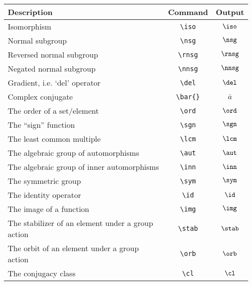 \documentclass[letterpaper,12pt]{article}
\begin{document}
		\begin{center}
		\begin{tabular}{| p{} | c | c |}
		\hline
		\textbf{Description} & \textbf{Command} & \textbf{Output} \\
		\hline \hline
		Isomorphism & \verb|\iso| & $\iso$ \\ \hline
		Normal subgroup & \verb|\nsg| & $\nsg$ \\ \hline
		Reversed normal subgroup & \verb|\rnsg| & $\rnsg$ \\ \hline
		Negated normal subgroup & \verb|\nnsg| & $\nnsg$ \\ \hline
		Gradient, i.e. `del' operator & \verb|\del| & $\del$ \\ \hline
		Complex conjugate & \verb|\bar{}| & $\bar{a}$ \\ \hline
		The order of a set/element & \verb|\ord| & $\ord$ \\ \hline
		The ``sign'' function & \verb|\sgn| & $\sgn$ \\ \hline
		The least common multiple & \verb|\lcm| & $\lcm$ \\ \hline
		The algebraic group of automorphisms & \verb|\aut| & $\aut$ \\ \hline
		The algebraic group of inner automorphisms & \verb|\inn| & $\inn$ \\ 
		\hline
		The symmetric group & \verb|\sym| & $\sym$ \\ \hline
		The identity operator & \verb|\id| & $\id$ \\ \hline
		The image of a function & \verb|\img| & $\img$ \\ \hline
		The stabilizer of an element under a group action & \verb|\stab| & 
				$\stab$ \\ \hline
				The orbit of an element under a group action & \verb|\orb| & 
				$\orb$ \\ 
				\hline
				The conjugacy class & \verb|\cl| & $\cl$ \\ \hline
		\end{tabular}
		\end{center}
\end{document}
